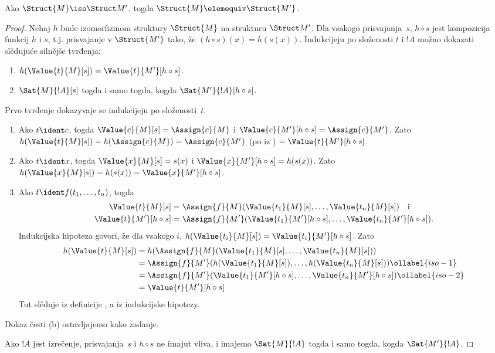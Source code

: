 \documentclass[../../../include/open-logic-section]{subfiles}
\begin{document}
\begin{thm}
Ako $\Struct{M} \iso \Struct M'$, togda $\Struct{M} \elemequiv
\Struct{M'}$.
\end{thm}

\begin{proof}
Nehaj $h$ bude izomorfizmom struktury $\Struct{M}$ na strukturu
$\Struct M'$. Dla vsakogo prisvajanja~$s$, $h \circ s$ jest
kompozicija funkcij $h$ i $s$, t.j. prisvajanje v $\Struct{M'}$ tako,
že $(h \circ s)(x) = h(s(x))$. Indukcijeju po složenosti $t$ i $!A$
možno dokazati slědujuće silnějše tvrđenja:
\begin{enumerate}
  \item[a.] $h(\Value{t}{M}[s]) = \Value{t}{M'}[h\circ s]$.
  \item[b.] $\Sat{M}{!A}[s]$ togda i samo togda, kogda $\Sat{M'}{!A}[h \circ s]$.
\end{enumerate}
Prvo tvrđenje dokazyvaje se indukcijeju po složenosti~$t$.
\begin{enumerate}
\item Ako $t \ident c$, togda $\Value{c}{M}[s] = \Assign{c}{M}$ i
  $\Value{c}{M'}[h \circ s] = \Assign{c}{M'}$. Zato
  $h(\Value{t}{M}[s]) = h(\Assign{c}{M}) = \Assign{c}{M'}$ (po
   iz ) $=
  \Value{t}{M'}[h \circ s]$.
\item Ako $t \ident x$, togda $\Value{x}{M}[s] = s(x)$ i
  $\Value{x}{M'}[h \circ s] = h(s(x))$. Zato $h(\Value{x}{M}[s]) =
  h(s(x)) = \Value{x}{M'}[h \circ s]$.
\item Ako $t \ident f(t_1, \dots, t_n)$, togda
  \begin{align*}
    \Value{t}{M}[s] & = \Assign{f}{M}(\Value{t_1}{M}[s], \dots, \Value{t_n}{M}[s]) \quad\text{i}\\
  \Value{t}{M'}[h \circ s] & = \Assign{f}{M'}(\Value{t_1}{M'}[h \circ
    s], \dots, \Value{t_n}{M'}[h \circ s]).
  \end{align*}
  Indukcijska hipoteza govori, že dla vsakogo $i$, $h(\Value{t_i}{M}[s])
  = \Value{t_i}{M'}[h\circ s]$. Zato
  \begin{align}
    h(\Value{t}{M}[s]) 
    & = h(\Assign{f}{M}(\Value{t_1}{M}[s], \dots, \Value{t_n}{M}[s]))\notag\\
    & = \Assign{f}{M'}(h(\Value{t_1}{M}[s]), \dots,
    h(\Value{t_n}{M}[s])) \ollabel{iso-1}\\
    & = \Assign{f}{M'}(\Value{t_1}{M'}[h \circ s], \dots,
    \Value{t_n}{M'}[h \circ s]) \ollabel{iso-2}\\
    & = \Value{t}{M'}[h\circ s] \notag
  \end{align}
  Tut  slěduje iz  definicije
  , a  iz indukcijske hipotezy.
\end{enumerate}
Dokaz česti (b) ostavljajemo kako zadanje.

Ako $!A$ jest izrečenje, prisvajanja~$s$ i $h \circ s$ ne imajut
vliva, i imajemo $\Sat{M}{!A}$ togda i samo togda, kogda
$\Sat{M'}{!A}$.
\end{proof}
\end{document}
